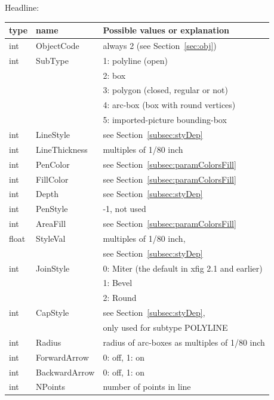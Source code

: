 \documentclass[10pt, a4paper, english]{article}%
\begin{document}
\noindent
Headline: \\
%
\begin{tabular}{lll}
\toprule
type   & name          & Possible values or explanation \\
\midrule
\midrule
int    & ObjectCode    & always 2 (see Section~\ref{sec:obj}) \\
int    & SubType       & 1: polyline (open) \\
&&                       2: box \\
&&                       3: polygon (closed, regular or not) \\
&&                       4: arc-box (box with round vertices) \\
&&                       5: imported-picture bounding-box \\
int    & LineStyle     & see Section~\ref{subsec:styDep} \\
int    & LineThickness & multiples of 1/80 inch \\
int    & PenColor      & see Section~\ref{subsec:paramColorsFill} \\
int    & FillColor     & see Section~\ref{subsec:paramColorsFill} \\
int    & Depth         & see Section~\ref{subsec:styDep} \\
int    & PenStyle      & -1, not used \\
int    & AreaFill      & see Section~\ref{subsec:paramColorsFill} \\
float  & StyleVal      & multiples of 1/80 inch, \\
&&                       see Section~\ref{subsec:styDep} \\
int    & JoinStyle     & 0: Miter (the default in xfig 2.1 and earlier) \\
&&                       1: Bevel \\
&&                       2: Round \\
int    & CapStyle      & see Section~\ref{subsec:styDep}, \\
&&                       only used for subtype POLYLINE \\
int    & Radius        & radius of arc-boxes as multiples of 1/80 inch \\
int    & ForwardArrow  & 0: off, 1: on \\
int    & BackwardArrow & 0: off, 1: on \\
int    & NPoints       & number of points in line \\
\bottomrule
\end{tabular}
\end{document}
